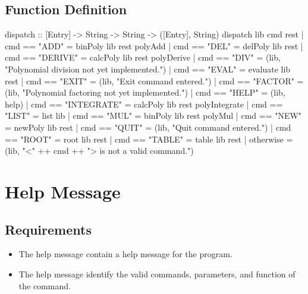 \subsection{Function Definition}
\begin{code}
dispatch :: [Entry] -> String -> String -> ([Entry], String)
dispatch lib cmd rest
  | cmd == "ADD"       = binPoly lib rest polyAdd
  | cmd == "DEL"       = delPoly lib rest
  | cmd == "DERIVE"    = calcPoly lib rest polyDerive
  | cmd == "DIV"       = (lib, "Polynomial division not yet implemented.")
  | cmd == "EVAL"      = evaluate lib rest
  | cmd == "EXIT"      = (lib, "Exit command entered.")
  | cmd == "FACTOR"    = (lib, "Polynomial factoring not yet implemented.")
  | cmd == "HELP"      = (lib, help)
  | cmd == "INTEGRATE" = calcPoly lib rest polyIntegrate
  | cmd == "LIST"      = list lib
  | cmd == "MUL"       = binPoly lib rest polyMul
  | cmd == "NEW"       = newPoly lib rest
  | cmd == "QUIT"      = (lib, "Quit command entered.")
  | cmd == "ROOT"      = root lib rest
  | cmd == "TABLE"     = table lib rest
  | otherwise          = (lib, "<" ++ cmd ++ "> is not a valid command.")
\end{code}

\section{Help Message}
\subsection{Requirements}
\begin{itemize}
\item The help message  contain a help message for the program.
\item The help message  identify the valid commands, parameters, and function of the command.
\end{itemize}

